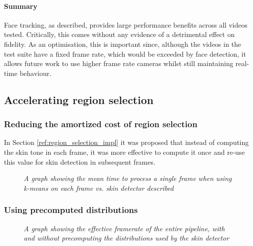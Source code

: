 

\paragraph{Summary}

Face tracking, as described, provides large performance benefits across all videos tested.
Critically, this comes without any evidence of a detrimental effect on fidelity. As an optimisation, this
is important since, although the videos in the test suite have a fixed frame rate, which would be exceeded by face detection, it allows future work to 
use higher frame rate cameras whilst still maintaining real-time behaviour. 

\subsection{Accelerating region selection}
\label{eval:region_selection}
\subsubsection{Reducing the amortized cost of region selection}
In Section \ref{ref:region_selection_impl} it was proposed that instead of computing the skin tone in each frame, it was more effective to compute it once and re-use this value 
for skin detection in subsequent frames.

\begin{figure}[H]
    \centering
    \scalebox{0.7}{}
   \caption{\textit{A graph showing the mean time to process a single frame when using k-means on each frame vs. skin detector described}} 
\end{figure}

\subsubsection{Using precomputed distributions}
\begin{figure}[H]
    \centering
    \scalebox{0.7}{}
   \caption{\textit{A graph showing the effective framerate of the entire pipeline, with and without precomputing the distributions used by the skin detector}} 
\end{figure}

